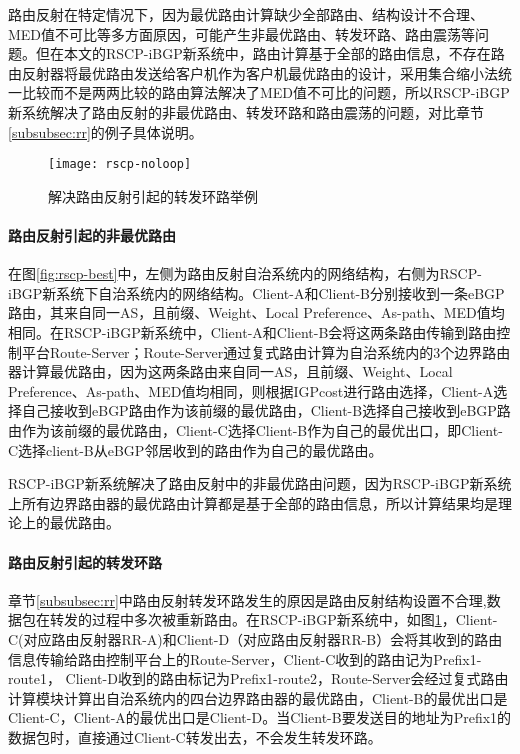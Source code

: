 路由反射在特定情况下，因为最优路由计算缺少全部路由、结构设计不合理、MED值不可比等多方面原因，可能产生非最优路由、转发环路、路由震荡等问题。但在本文的RSCP-iBGP新系统中，路由计算基于全部的路由信息，不存在路由反射器将最优路由发送给客户机作为客户机最优路由的设计，采用集合缩小法统一比较而不是两两比较的路由算法解决了MED值不可比的问题，所以RSCP-iBGP新系统解决了路由反射的非最优路由、转发环路和路由震荡的问题，对比章节\ref{subsubsec:rr}的例子具体说明。\\

\begin{figure}
  \centering
  \texttt{[image: rscp-noloop]}
  \caption{解决路由反射引起的转发环路举例}
  \label{fig:rscp-noloop}
\end{figure}


\paragraph{路由反射引起的非最优路由}
在图\ref{fig:rscp-best}中，左侧为路由反射自治系统内的网络结构，右侧为RSCP-iBGP新系统下自治系统内的网络结构。Client-A和Client-B分别接收到一条eBGP路由，其来自同一AS，且前缀、Weight、Local Preference、As-path、MED值均相同。在RSCP-iBGP新系统中，Client-A和Client-B会将这两条路由传输到路由控制平台Route-Server；Route-Server通过复式路由计算为自治系统内的3个边界路由器计算最优路由，因为这两条路由来自同一AS，且前缀、Weight、Local Preference、As-path、MED值均相同，则根据IGPcost进行路由选择，Client-A选择自己接收到eBGP路由作为该前缀的最优路由，Client-B选择自己接收到eBGP路由作为该前缀的最优路由，Client-C选择Client-B作为自己的最优出口，即Client-C选择client-B从eBGP邻居收到的路由作为自己的最优路由。

RSCP-iBGP新系统解决了路由反射中的非最优路由问题，因为RSCP-iBGP新系统上所有边界路由器的最优路由计算都是基于全部的路由信息，所以计算结果均是理论上的最优路由。\\


\paragraph{路由反射引起的转发环路}

章节\ref{subsubsec:rr}中路由反射转发环路发生的原因是路由反射结构设置不合理,数据包在转发的过程中多次被重新路由。在RSCP-iBGP新系统中，如图\ref{fig:rscp-noloop}，Client-C(对应路由反射器RR-A)和Client-D（对应路由反射器RR-B）会将其收到的路由信息传输给路由控制平台上的Route-Server，Client-C收到的路由记为Prefix1-route1， Client-D收到的路由标记为Prefix1-route2，Route-Server会经过复式路由计算模块计算出自治系统内的四台边界路由器的最优路由，Client-B的最优出口是Client-C，Client-A的最优出口是Client-D。当Client-B要发送目的地址为Prefix1的数据包时，直接通过Client-C转发出去，不会发生转发环路。\\

